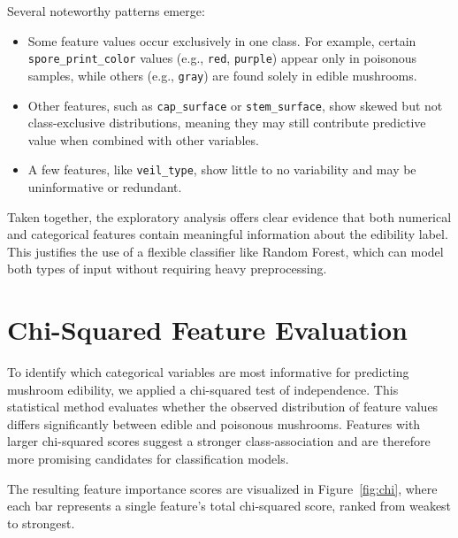 \documentclass[a4paper,11pt]{article}
\begin{document}
Several noteworthy patterns emerge:
\begin{itemize}
  \item Some feature values occur exclusively in one class. For example, certain \texttt{spore\_print\_color} values (e.g., \texttt{red}, \texttt{purple}) appear only in poisonous samples, while others (e.g., \texttt{gray}) are found solely in edible mushrooms.
  \item Other features, such as \texttt{cap\_surface} or \texttt{stem\_surface}, show skewed but not class-exclusive distributions, meaning they may still contribute predictive value when combined with other variables.
  \item A few features, like \texttt{veil\_type}, show little to no variability and may be uninformative or redundant.
\end{itemize}

Taken together, the exploratory analysis offers clear evidence that both numerical and categorical features contain meaningful information about the edibility label. This justifies the use of a flexible classifier like Random Forest, which can model both types of input without requiring heavy preprocessing.



\section{Chi-Squared Feature Evaluation}

To identify which categorical variables are most informative for predicting mushroom edibility, we applied a chi-squared test of independence. This statistical method evaluates whether the observed distribution of feature values differs significantly between edible and poisonous mushrooms. Features with larger chi-squared scores suggest a stronger class-association and are therefore more promising candidates for classification models.

The resulting feature importance scores are visualized in Figure~\ref{fig:chi}, where each bar represents a single feature’s total chi-squared score, ranked from weakest to strongest.
\end{document}
